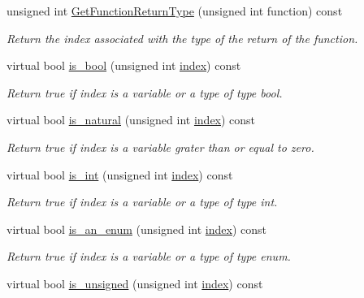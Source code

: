 \begin{DoxyCompactItemize}
unsigned int \hyperlink{classBehavioralHelper_aef8f504d20cd83dd699378e233b86ae6}{Get\+Function\+Return\+Type} (unsigned int function) const
\begin{DoxyCompactList}\small\item\em Return the index associated with the type of the return of the function. \end{DoxyCompactList}\item 
virtual bool \hyperlink{classBehavioralHelper_a50ae88f9b0101175e72f66e8010ef88e}{is\+\_\+bool} (unsigned int \hyperlink{tutorial__pact__2019_2Introduction_2third_2include_2Keccak_8h_a028c9bdc8344cca38ab522a337074797}{index}) const
\begin{DoxyCompactList}\small\item\em Return true if index is a variable or a type of type bool. \end{DoxyCompactList}\item 
virtual bool \hyperlink{classBehavioralHelper_afd32eb4b60122768233ad5dca8a822ab}{is\+\_\+natural} (unsigned int \hyperlink{tutorial__pact__2019_2Introduction_2third_2include_2Keccak_8h_a028c9bdc8344cca38ab522a337074797}{index}) const
\begin{DoxyCompactList}\small\item\em Return true if index is a variable grater than or equal to zero. \end{DoxyCompactList}\item 
virtual bool \hyperlink{classBehavioralHelper_abad4a8f3a5f0846bc2b10b3da91dd423}{is\+\_\+int} (unsigned int \hyperlink{tutorial__pact__2019_2Introduction_2third_2include_2Keccak_8h_a028c9bdc8344cca38ab522a337074797}{index}) const
\begin{DoxyCompactList}\small\item\em Return true if index is a variable or a type of type int. \end{DoxyCompactList}\item 
virtual bool \hyperlink{classBehavioralHelper_a2b986a13b2680b8949a2221cad6820d7}{is\+\_\+an\+\_\+enum} (unsigned int \hyperlink{tutorial__pact__2019_2Introduction_2third_2include_2Keccak_8h_a028c9bdc8344cca38ab522a337074797}{index}) const
\begin{DoxyCompactList}\small\item\em Return true if index is a variable or a type of type enum. \end{DoxyCompactList}\item 
virtual bool \hyperlink{classBehavioralHelper_a3f1e46296fca88d2d3cf26c121cd7c0d}{is\+\_\+unsigned} (unsigned int \hyperlink{tutorial__pact__2019_2Introduction_2third_2include_2Keccak_8h_a028c9bdc8344cca38ab522a337074797}{index}) const

\end{DoxyCompactItemize}
